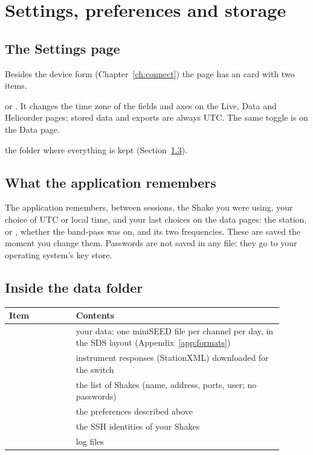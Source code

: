 \chapter{Settings, preferences and storage}\label{ch:storage}

\section{The Settings page}
Besides the device form (Chapter~\ref{ch:connect}) the  page has an  card with two items.
\begin{description}[leftmargin=3.2cm,style=nextline]
\item[Time shown as]  or . It changes the time zone of the fields and axes on the Live, Data and Helicorder pages; stored data
  and exports are always UTC. The same toggle is on the Data page.
\item[Data folder] the folder where everything is kept (Section~\ref{sec:folder}).
\end{description}

\section{What the application remembers}
The application remembers, between sessions, the Shake you were using, your choice of UTC or local time, and your last choices on
the data pages: the station,  or , whether the band-pass was on, and its two frequencies. These are saved the
moment you change them. Passwords are not saved in any file: they go to your operating system's key store.

\section{Inside the data folder}\label{sec:folder}
\begin{center}
\begin{tabular}{@{}L{0.22\linewidth}L{0.68\linewidth}@{}}
\toprule
Item & Contents\\ \midrule
{} & your data: one miniSEED file per channel per day, in the SDS layout (Appendix~\ref{app:formats})\\
 & instrument responses (StationXML) downloaded for the  switch\\
 & the list of Shakes (name, address, ports, user; no passwords)\\
 & the preferences described above\\
 & the SSH identities of your Shakes\\
 & log files\\
\bottomrule
\end{tabular}
\end{center}

